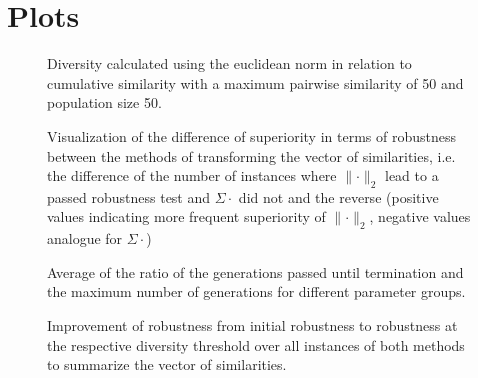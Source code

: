 \documentclass{article}
\begin{document}
\section{Plots}
\begin{figure}[H]
\centering
 \caption{Diversity calculated using the euclidean norm in relation to cumulative similarity with a maximum pairwise similarity of 50 and population size 50.}
\vskip-8pt
\end{figure}
\begin{figure}[H]
\centering
 \caption{Visualization of the difference of superiority in terms of robustness between the methods of transforming the vector of similarities, i.e. the difference of the number of instances where $\lVert \cdot \rVert _2$ lead to a passed robustness test and $\Sigma \cdot$ did not and the reverse (positive values indicating more frequent superiority of $\lVert \cdot \rVert_2$, negative values analogue for $\Sigma \cdot$)}
\vskip-8pt
\end{figure}
\begin{figure}[H]
\centering
 \caption{Average of the ratio of the generations passed until termination and the maximum number of generations for different parameter groups.}
\vskip-8pt
\end{figure}
\begin{figure}[H]
\centering
 \caption{Improvement of robustness from initial robustness to robustness at the respective diversity threshold over all instances of both methods to summarize the vector of similarities.}
\vskip-8pt
\end{figure}
\newpage
\end{document}

